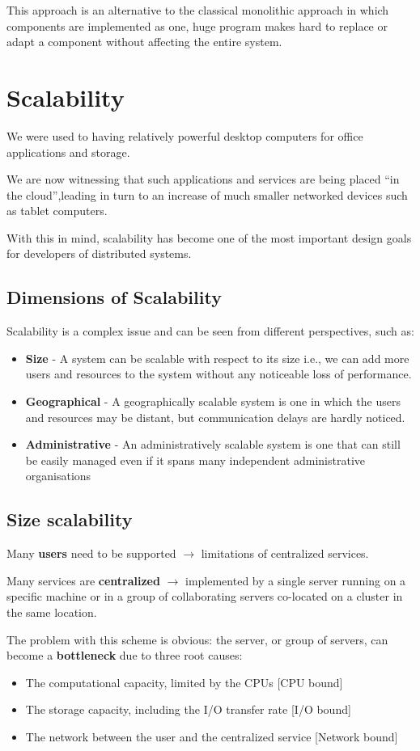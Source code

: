 This approach is an alternative to the classical monolithic approach in which components are implemented as one, huge program makes hard to replace or adapt a component without affecting the entire system.

\section{Scalability}
We were used to having relatively powerful desktop computers for office applications and storage.

We are now witnessing that such applications and services are being placed ``in the cloud'',leading in turn to an increase of much smaller networked devices such as tablet computers.

With this in mind, scalability has become one of the most important design goals for developers of distributed systems.

\subsection{Dimensions of Scalability}
Scalability is a complex issue and can be seen from different perspectives, such as:
\begin{itemize}
\item \textbf{Size} - A system can be scalable with respect to its size i.e., we can add more users and resources to the system without any noticeable loss of performance.
\item \textbf{Geographical} - A geographically scalable system is one in which the users and resources may be distant, but communication delays are hardly noticed.
\item \textbf{Administrative} - An administratively scalable system is one that can still be easily managed even if it spans many independent administrative organisations
\end{itemize}

\subsection{Size scalability}
Many \textbf{users} need to be supported $\rightarrow$ limitations of centralized services.

Many services are \textbf{centralized} $\rightarrow$ implemented by a single server running on a specific machine or in a group of collaborating servers co-located on a cluster in the same location.

The problem with this scheme is obvious: the server, or group of servers, can become a \textbf{bottleneck} due to three root causes:
\begin{itemize}
   \item The computational capacity, limited by the CPUs [CPU bound]
   \item The storage capacity, including the I/O transfer rate [I/O bound]
   \item The network between the user and the centralized service
   [Network bound]
\end{itemize}

